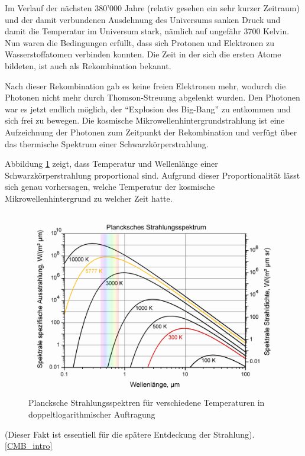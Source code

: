 Im Verlauf der nächsten 380'000 Jahre (relativ gesehen ein sehr kurzer Zeitraum) und der damit verbundenen Ausdehnung des 
Universums sanken Druck und damit die Temperatur im Universum stark, nämlich auf ungefähr 3700 
Kelvin.
Nun waren die Bedingungen erfüllt, dass sich Protonen und Elektronen zu 
Wasserstoffatomen verbinden konnten.
Die Zeit in der sich die ersten Atome bildeten, ist auch als Rekombination bekannt.

Nach dieser Rekombination gab es keine freien Elektronen mehr, wodurch die 
Photonen nicht mehr durch Thomson-Streuung abgelenkt wurden.
Den Photonen war es jetzt endlich möglich, der ``Explosion des Big-Bang'' zu 
entkommen und sich frei zu bewegen.
Die kosmische Mikrowellenhintergrundstrahlung ist eine Aufzeichnung der Photonen zum 
Zeitpunkt der Rekombination und verfügt über das thermische Spektrum einer Schwarzkörperstrahlung.

Abbildung \ref{fig:blackbody_spectrum} zeigt, dass Temperatur und Wellenlänge einer Schwarzkörperstrahlung proportional sind.
Aufgrund dieser Proportionalität lässt sich genau vorhersagen, welche Temperatur der kosmische Mikrowellenhintergrund zu welcher Zeit hatte.
\begin{figure}
	\centering
	\includegraphics[width=\linewidth]{cmb/images/blackbody_spectrum.png}
	\caption{Plancksche Strahlungsspektren für verschiedene Temperaturen in doppeltlogarithmischer Auftragung}
	\label{fig:blackbody_spectrum}
\end{figure}
(Dieser Fakt ist essentiell für die spätere Entdeckung der Strahlung).
\ref{CMB_intro}

